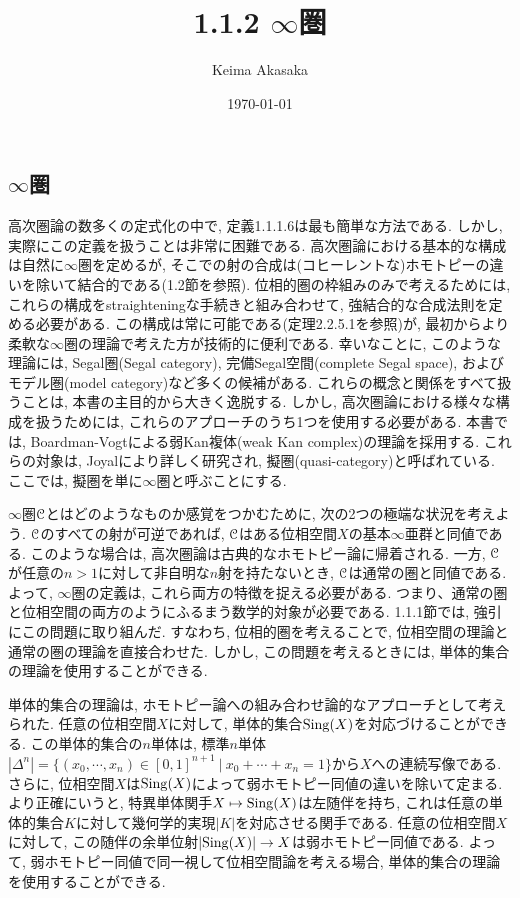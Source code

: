 \documentclass[uplatex, a4paper, 14Q, dvipdfmx]{jsreport}
\title{1.1.2 \texorpdfstring{$\infty$}{infty}圏}
\author{Keima Akasaka}
\date{\today}
\begin{document}
\maketitle

\setcounter{chapter}{1}
\setcounter{section}{1} 
\setcounter{subsection}{1}   
\setcounter{subsubsection}{1}

\subsection{\texorpdfstring{$\infty$}{infty}圏}

高次圏論の数多くの定式化の中で, 定義1.1.1.6は最も簡単な方法である. 
しかし, 実際にこの定義を扱うことは非常に困難である. 
高次圏論における基本的な構成は自然に$\infty$圏を定めるが, そこでの射の合成は(コヒーレントな)ホモトピーの違いを除いて結合的である(1.2節を参照).
位相的圏の枠組みのみで考えるためには, これらの構成をstraighteningな手続きと組み合わせて, 強結合的な合成法則を定める必要がある. 
この構成は常に可能である(定理2.2.5.1を参照)が, 最初からより柔軟な$\infty$圏の理論で考えた方が技術的に便利である. 
幸いなことに, このような理論には, Segal圏(Segal category), 完備Segal空間(complete Segal space), およびモデル圏(model category)など多くの候補がある. 
これらの概念と関係をすべて扱うことは, 本書の主目的から大きく逸脱する. 
しかし, 高次圏論における様々な構成を扱うためには, これらのアプローチのうち1つを使用する必要がある. 
本書では, Boardman-Vogtによる弱Kan複体(weak Kan complex)の理論を採用する. 
これらの対象は, Joyalにより詳しく研究され, 擬圏(quasi-category)と呼ばれている. 
ここでは, 擬圏を単に$\infty$圏と呼ぶことにする. 

$\infty$圏$\mathcal{C}$とはどのようなものか感覚をつかむために, 次の2つの極端な状況を考えよう. 
$\mathcal{C}$のすべての射が可逆であれば, $\mathcal{C}$はある位相空間$X$の基本$\infty$亜群と同値である. 
このような場合は, 高次圏論は古典的なホモトピー論に帰着される. 
一方, $\mathcal{C}$が任意の$n>1$に対して非自明な$n$射を持たないとき, $\mathcal{C}$は通常の圏と同値である. 
よって, $\infty$圏の定義は, これら両方の特徴を捉える必要がある. 
つまり、通常の圏と位相空間の両方のようにふるまう数学的対象が必要である. 
1.1.1節では, 強引にこの問題に取り組んだ. 
すなわち, 位相的圏を考えることで, 位相空間の理論と通常の圏の理論を直接合わせた. 
しかし, この問題を考えるときには, 単体的集合の理論を使用することができる. 

単体的集合の理論は, ホモトピー論への組み合わせ論的なアプローチとして考えられた. 
任意の位相空間$X$に対して, 単体的集合$\mathrm{Sing}(X)$を対応づけることができる. 
この単体的集合の$n$単体は, 標準$n$単体$|\Delta^n| = \{(x_0,\cdots,x_n) \in [0,1]^{n+1} ~|~ x_0 + \cdots + x_n = 1\}$から$X$への連続写像である. 
さらに, 位相空間$X$は$\mathrm{Sing}(X)$によって弱ホモトピー同値の違いを除いて定まる. 
より正確にいうと, 特異単体関手$X \mapsto \mathrm{Sing}(X)$は左随伴を持ち, これは任意の単体的集合$K$に対して幾何学的実現$|K|$を対応させる関手である. 
任意の位相空間$X$に対して, この随伴の余単位射$|\mathrm{Sing}(X)| \to X$は弱ホモトピー同値である. 
よって, 弱ホモトピー同値で同一視して位相空間論を考える場合, 単体的集合の理論を使用することができる. 
\end{document}
